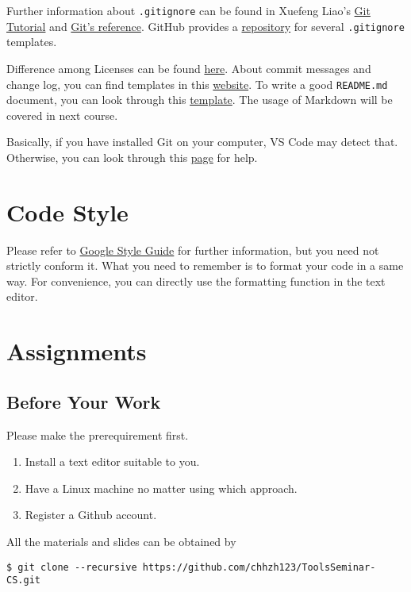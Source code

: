 \documentclass[english]{../TexTemplate/thesis}
\begin{document}
Further information about \verb".gitignore" can be found in Xuefeng Liao's \href{https://www.liaoxuefeng.com/wiki/0013739516305929606dd18361248578c67b8067c8c017b000/0013758404317281e54b6f5375640abbb11e67be4cd49e0000}{Git Tutorial} and \href{https://git-scm.com/docs/gitignore}{Git's reference}. GitHub provides a \href{https://github.com/github/gitignore}{repository} for several \verb".gitignore" templates.

Difference among Licenses can be found \href{https://choosealicense.com/licenses/}{here}.
About commit messages and change log, you can find templates in this \href{https://blog.coding.net/blog/commit_message_change_log}{website}.
To write a good \verb'README.md' document, you can look through this \href{https://gist.github.com/PurpleBooth/109311bb0361f32d87a2}{template}.
The usage of Markdown will be covered in next course.

Basically, if you have installed Git on your computer, VS Code may detect that.
Otherwise, you can look through this \href{https://code.visualstudio.com/docs/editor/versioncontrol}{page} for help.

\section{Code Style}
Please refer to \href{http://google.github.io/styleguide/}{Google Style Guide} for further information, but you need not strictly conform it.
What you need to remember is to format your code in a same way.
For convenience, you can directly use the formatting function in the text editor.

\newpage
\section{Assignments}
\subsection{Before Your Work}
Please make the prerequirement first.
\begin{enumerate}
\item Install a text editor suitable to you.
\item Have a Linux machine no matter using which approach.
\item Register a Github account.
\end{enumerate}

All the materials and slides can be obtained by
\begin{lstlisting}
$ git clone --recursive https://github.com/chhzh123/ToolsSeminar-CS.git
\end{lstlisting}
\end{document}
